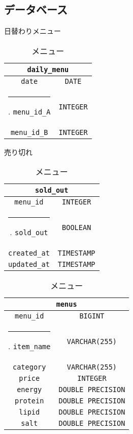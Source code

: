 \documentclass[a4paper]{ltjsarticle}
\makeatletter
\def\Hline{
    \noalign{\ifnum0=`}\fi\hrule \@height 2.\arrayrulewidth \futurelet
    \reserved@a\@xhline}
\makeatother
\begin{document}
    \subsection{データベース}
        \begin{table}[h]
            \begin{minipage}[t]{.49\textwidth}
                \center
                \caption{日替わりメニュー}
                \label{daily-menu}
                \begin{tabular}{|c|c|}
                    \hline
                    \multicolumn{2}{|c|}{\texttt{daily\_menu}} \\ \hline \hline
                    \verb|date| & \verb|DATE| \\ \Hline
                    \verb|menu_id_A| & \verb|INTEGER| \\ \hline
                    \verb|menu_id_B| & \verb|INTEGER| \\ \hline
                \end{tabular}
                \center
                \caption{売り切れ}
                \label{soldout}
                \begin{tabular}{|c|c|}
                    \hline
                    \multicolumn{2}{|c|}{\texttt{sold\_out}} \\ \hline \hline
                    \verb|menu_id| & \verb|INTEGER| \\ \Hline
                    \verb|sold_out| & \verb|BOOLEAN| \\ \hline
                    \verb|created_at| & \verb|TIMESTAMP| \\ \hline
                    \verb|updated_at| & \verb|TIMESTAMP| \\ \hline
                \end{tabular}
            \end{minipage}
            \begin{minipage}[t]{.49\textwidth}
                \center
                \caption{メニュー}
                \label{menu}
                \begin{tabular}{|c|c|}
                    \hline
                    \multicolumn{2}{|c|}{\texttt{menus}} \\ \hline \hline
                    \verb|menu_id| & \verb|BIGINT| \\ \Hline
                    \verb|item_name| & \verb|VARCHAR(255)| \\ \hline
                    \verb|category| & \verb|VARCHAR(255)| \\ \hline
                    \verb|price| & \verb|INTEGER| \\ \hline
                    \verb|energy| & \verb|DOUBLE PRECISION| \\ \hline
                    \verb|protein| & \verb|DOUBLE PRECISION| \\ \hline
                    \verb|lipid| & \verb|DOUBLE PRECISION| \\ \hline
                    \verb|salt| & \verb|DOUBLE PRECISION| \\ \hline
                \end{tabular}
            \end{minipage}
        \end{table}
\end{document}
